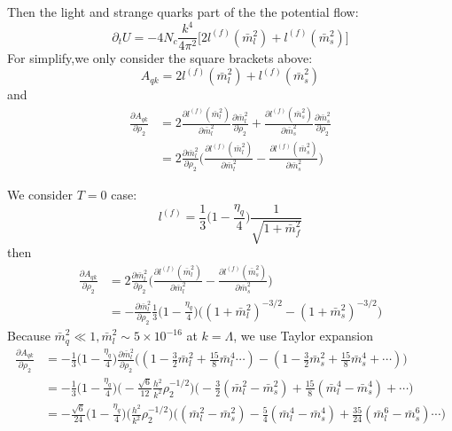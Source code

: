 \documentclass[12pt]{article}
\begin{document}
Then the light and strange quarks part of the the potential flow:
\begin{equation}
\partial_t U= -4 N_c \frac{k^4}{4\pi^2} \Big[2l^{(f)}(\bar m_l^2)+l^{(f)}(\bar m_s^2)\Big]
\end{equation}
For simplify,we only consider the square brackets above:
\begin{equation}
A_{qk}= 2l^{(f)}(\bar m_l^2)+l^{(f)}(\bar m_s^2)
\end{equation}
and
\begin{equation}
\begin{split}
\frac{\partial A_{qk}}{\partial \rho_2}
&=2 \frac{\partial l^{(f)}(\bar m_l^2)}{\partial \bar m_l^2} \frac{\partial \bar m_l^2}{\partial \rho_2}
+\frac{\partial l^{(f)}(\bar m_s^2)}{\partial \bar m_s^2} \frac{\partial \bar m_s^2}{\partial \rho_2}\\
&=2 \frac{\partial \bar m_l^2}{\partial \rho_2} \Big(\frac{\partial l^{(f)}(\bar m_l^2)}{\partial \bar m_l^2} - \frac{\partial l^{(f)}(\bar m_s^2)}{\partial \bar m_s^2}\Big)
\end{split}
\end{equation}

We consider $T=0$ case:
\begin{equation}
l^{(f)}=\frac{1}{3}\Big(1-\frac{\eta_q}{4}\Big)\frac{1}{\sqrt{1+\bar m _f^2}}
\end{equation}
then
\begin{equation}
\begin{split}
\frac{\partial A_{qk}}{\partial \rho_2}
&=2 \frac{\partial \bar m_l^2}{\partial \rho_2} \Big(\frac{\partial l^{(f)}(\bar m_l^2)}{\partial \bar m_l^2} - \frac{\partial l^{(f)}(\bar m_s^2)}{\partial \bar m_s^2}\Big)\\
&=- \frac{\partial \bar m_l^2}{\partial \rho_2} \frac{1}{3}\Big(1-\frac{\eta_q}{4}\Big)\Big((1+\bar m_l^2)^{-3/2}-(1+ \bar m_s^2)^{-3/2}\Big)
\end{split}
\end{equation}
Because $\bar m_q^2 \ll 1,\bar m_l^2 \sim 5\times 10^{-16}$ at $k=\Lambda$, we use Taylor expansion
\begin{equation}
\begin{split}
\frac{\partial A_{qk}}{\partial \rho_2}
&=- \frac{1}{3} \Big(1-\frac{\eta_q}{4} \Big) \frac{\partial \bar m_l^2}{\partial \rho_2}
 \Big((1-\frac{3}{2} \bar m_l^2 +\frac{15}{8} \bar m_l^4 \cdots)-(1-\frac{3}{2} \bar m_s^2 + \frac{15}{8} \bar m_s^4+\cdots)\Big)\\
&=- \frac{1}{3} \Big(1-\frac{\eta_q}{4} \Big) \Big( -\frac{\sqrt{6}}{12} \frac{h^2}{k^2}\rho_2^{-1/2}\Big)
 \Big(-\frac{3}{2} (\bar m_l^2 - \bar m_s^2) +\frac{15}{8} (\bar m_l^4 - \bar m_s^4 )+\cdots\Big)\\
 &=-\frac{\sqrt{6}}{24}\Big(1-\frac{\eta_q}{4} \Big) \Big( \frac{h^2}{k^2}\rho_2^{-1/2}\Big)
 \Big((\bar m_l^2 - \bar m_s^2) -\frac{5}{4} (\bar m_l^4 - \bar m_s^4 )+\frac{35}{24} (\bar m_l^6 - \bar m_s^6)\cdots\Big)
 \end{split}
\end{equation}
\end{document}
